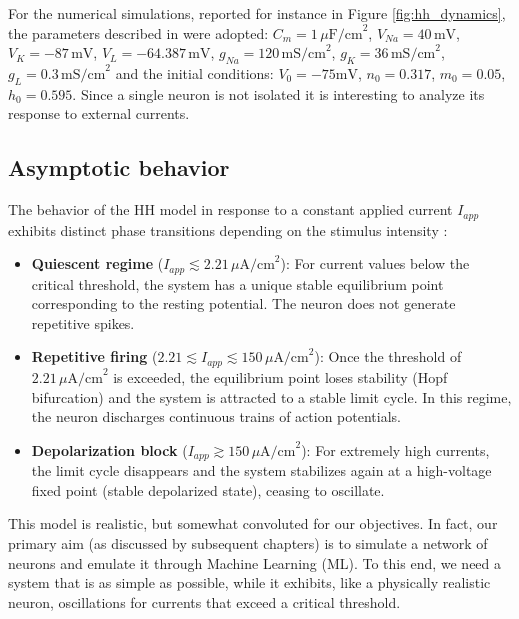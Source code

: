 For the numerical simulations, reported for instance in Figure \ref{fig:hh_dynamics}, the parameters described in \cite{centofanti2024cma} were adopted: $C_m = 1 \, \mu\text{F/cm}^2$, $V_{Na} = 40 \, \text{mV}$, $V_{K} = -87 \, \text{mV}$, $V_{L} = -64.387 \, \text{mV}$, $g_{Na} = 120 \, \text{mS/cm}^2$, $g_{K} = 36 \, \text{mS/cm}^2$, $g_{L} = 0.3 \, \text{mS/cm}^2$ and the initial conditions: $V_0= -75 \text{mV}$, $n_0=0.317$, $m_0=0.05$, $h_0=0.595$.
Since a single neuron is not isolated it is interesting to analyze its response to external currents.

\subsection*{Asymptotic behavior}
The behavior of the HH model in response to a constant applied current $I_{app}$ exhibits distinct phase transitions depending on the stimulus intensity \cite{centofanti2024cma}:

\begin{itemize}
    \item \textbf{Quiescent regime} ($I_{app} \lesssim 2.21 \, \mu\text{A/cm}^2$):
    For current values below the critical threshold, the system has a unique stable equilibrium point corresponding to the resting potential. The neuron does not generate repetitive spikes.
    
    \item \textbf{Repetitive firing} ($2.21 \lesssim I_{app} \lesssim 150 \, \mu\text{A/cm}^2$):
    Once the threshold of $2.21 \, \mu\text{A/cm}^2$ is exceeded, the equilibrium point loses stability (Hopf bifurcation) and the system is attracted to a stable limit cycle. In this regime, the neuron discharges continuous trains of action potentials.
    
    \item \textbf{Depolarization block} ($I_{app} \gtrsim 150 \, \mu\text{A/cm}^2$):
    For extremely high currents, the limit cycle disappears and the system stabilizes again at a high-voltage fixed point (stable depolarized state), ceasing to oscillate.
\end{itemize}

This model is realistic, but somewhat convoluted for our objectives. In fact, our primary aim (as discussed by subsequent chapters) is to simulate a network of neurons and emulate it through Machine Learning (ML). To this end, we need a system that is as simple as possible, while it exhibits, like a physically realistic neuron, oscillations for currents that exceed a critical threshold.

